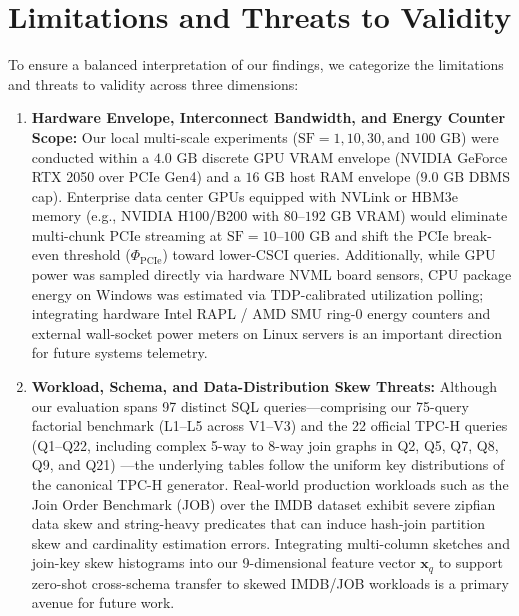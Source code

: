 \documentclass[10pt,a4paper]{article}
\begin{document}
\section{Limitations and Threats to Validity}
To ensure a balanced interpretation of our findings, we categorize the limitations and threats to validity across three dimensions:
\begin{enumerate}[leftmargin=1.5em,itemsep=2pt]
    \item \textbf{Hardware Envelope, Interconnect Bandwidth, and Energy Counter Scope:} Our local multi-scale experiments ($\text{SF}=1, 10, 30, \text{and } 100\text{ GB}$) were conducted within a $4.0\text{ GB}$ discrete GPU VRAM envelope (NVIDIA GeForce RTX 2050 over PCIe Gen4) and a $16\text{ GB}$ host RAM envelope ($9.0\text{ GB}$ DBMS cap). Enterprise data center GPUs equipped with NVLink or HBM3e memory (e.g., NVIDIA H100/B200 with $80\text{--}192\text{ GB}$ VRAM) would eliminate multi-chunk PCIe streaming at $\text{SF}=10\text{--}100\text{ GB}$ and shift the PCIe break-even threshold ($\Phi_{\text{PCIe}}$) toward lower-CSCI queries. Additionally, while GPU power was sampled directly via hardware NVML board sensors, CPU package energy on Windows was estimated via TDP-calibrated utilization polling; integrating hardware Intel RAPL / AMD SMU ring-0 energy counters and external wall-socket power meters on Linux servers is an important direction for future systems telemetry.
    \item \textbf{Workload, Schema, and Data-Distribution Skew Threats:} Although our evaluation spans 97 distinct SQL queries---comprising our 75-query factorial benchmark (L1--L5 across V1--V3) and the 22 official TPC-H queries (Q1--Q22, including complex 5-way to 8-way join graphs in Q2, Q5, Q7, Q8, Q9, and Q21) \cite{tpc2022tpch,dreseler2020quantifying}---the underlying tables follow the uniform key distributions of the canonical TPC-H generator. Real-world production workloads such as the Join Order Benchmark (JOB) \cite{leis2015job} over the IMDB dataset exhibit severe zipfian data skew and string-heavy predicates that can induce hash-join partition skew and cardinality estimation errors. Integrating multi-column sketches and join-key skew histograms into our 9-dimensional feature vector $\mathbf{x}_q$ to support zero-shot cross-schema transfer to skewed IMDB/JOB workloads is a primary avenue for future work.

\end{enumerate}
\end{document}
